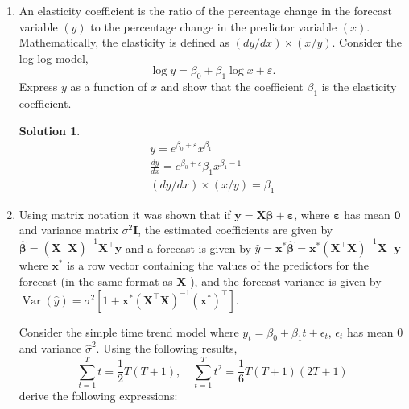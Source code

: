 \documentclass[a4paper,UTF8]{article}
\numberwithin{equation}{section}
\newtheorem*{mySol}{Solution}
\begin{document}
\begin{enumerate}
\item An elasticity coefficient is the ratio of the percentage change in the forecast variable $(y)$ to the percentage change in the predictor variable $(x)$. Mathematically, the elasticity is defined as $(d y / d x) \times(x / y)$. Consider the log-log model,
$$
\log y=\beta_0+\beta_1 \log x+\varepsilon .
$$
Express $y$ as a function of $x$ and show that the coefficient $\beta_1$ is the elasticity coefficient.

\begin{mySol}
    \begin{align*}
        y = e^{\beta_0+\varepsilon}x^{\beta_1}\\
        \frac{dy}{dx}=e^{\beta_0+\varepsilon}\beta_1x^{\beta_1-1}\\
        (dy/dx) \times (x/y)=\beta_1
    \end{align*}
\end{mySol}



\item Using matrix notation it was shown that if $\boldsymbol{y}=\boldsymbol{X} \boldsymbol{\beta}+\boldsymbol{\varepsilon}$, where $\boldsymbol{\varepsilon}$ has mean $\mathbf{0}$ and variance matrix $\sigma^2 \boldsymbol{I}$, the estimated coefficients are given by $\hat{\boldsymbol{\beta}}=\left(\boldsymbol{X}^\top \boldsymbol{X}\right)^{-1} \boldsymbol{X}^\top \boldsymbol{y}$ and a forecast is given by $\hat{y}=\boldsymbol{x}^* \hat{\boldsymbol{\beta}}=\boldsymbol{x}^*\left(\boldsymbol{X}^\top \boldsymbol{X}\right)^{-1} \boldsymbol{X}^\top \boldsymbol{y}$ where $\boldsymbol{x}^*$ is a row vector containing the values of the predictors for the forecast (in the same format as $\boldsymbol{X}$ ), and the forecast variance is given by $\operatorname{Var}(\hat{y})=\sigma^2\left[1+\boldsymbol{x}^*\left(\boldsymbol{X}^\top \boldsymbol{X}\right)^{-1}\left(\boldsymbol{x}^*\right)^\top\right]$.


Consider the simple time trend model where $y_t=\beta_0+\beta_1 t + \epsilon_t$, $\epsilon_t$ has mean 0 and variance $\hat{\sigma}^2$. Using the following results,
$$
\sum_{t=1}^T t=\frac{1}{2} T(T+1), \quad \sum_{t=1}^T t^2=\frac{1}{6} T(T+1)(2 T+1)
$$
derive the following expressions:


\end{enumerate}
\end{document}
